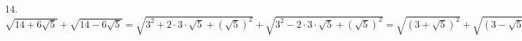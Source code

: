 14. $\sqrt{14+6\sqrt{5}}+\sqrt{14-6\sqrt{5}}=\sqrt{3^2+2\cdot3\cdot\sqrt{5}+(\sqrt{5})^2}+\sqrt{3^2-2\cdot3\cdot\sqrt{5}+(\sqrt{5})^2}=\sqrt{(3+\sqrt{5})^2}+
\sqrt{(3-\sqrt{5})^2}=|3+\sqrt{5}|+|3-\sqrt{5}|=3+\sqrt{5}+3-\sqrt{5}=6.$\\
